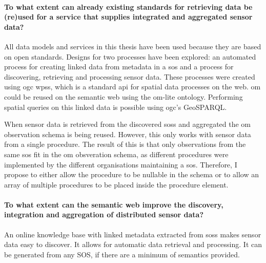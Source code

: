 \paragraph{To what extent can already existing standards for retrieving data be (re)used for a service that supplies integrated and aggregated sensor data?}\mbox{}

All data models and services in this thesis have been used because they are based on open standards. Designs for two processes have been explored: an automated process for creating linked data from metadata in a \ac{sos} and a process for discovering, retrieving and processing sensor data. These processes were created using \ac{ogc} \aclp{wps}, which is a standard \ac{api} for spatial data processes on the web. \ac{om} could be reused on the semantic web using the om-lite ontology. Performing spatial queries on this linked data is possible using \ac{ogc}'s GeoSPARQL.

When sensor data is retrieved from the discovered \aclp{sos} and aggregated the \ac{om} observation schema is being reused. However, this only works with sensor data from a single procedure. The result of this is that only observations from the same \ac{sos} fit in the \ac{om} obsveration schema, as different procedures were implemented by the different organisations maintaining a \ac{sos}. Therefore, I propose to either allow the procedure to be nullable in the schema or to allow an array of multiple procedures to be placed inside the procedure element.  


\paragraph{To what extent can the semantic web improve the discovery, integration and aggregation of distributed sensor data?}\mbox{}

An online knowledge base with linked metadata extracted from \aclp{sos} makes sensor data easy to discover. It allows for automatic data retrieval and processing. It can be generated from any SOS, if there are a minimum of semantics provided. 

